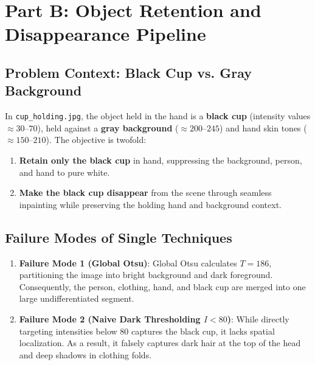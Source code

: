 \documentclass[12pt]{article}
\begin{document}
\section{Part B: Object Retention and Disappearance Pipeline}

\subsection{Problem Context: Black Cup vs. Gray Background}
In \texttt{cup\_holding.jpg}, the object held in the hand is a \textbf{black cup} (intensity values $\approx 30\text{--}70$), held against a \textbf{gray background} ($\approx 200\text{--}245$) and hand skin tones ($\approx 150\text{--}210$).
The objective is twofold:
\begin{enumerate}
    \item \textbf{Retain only the black cup} in hand, suppressing the background, person, and hand to pure white.
    \item \textbf{Make the black cup disappear} from the scene through seamless inpainting while preserving the holding hand and background context.
\end{enumerate}

\subsection{Failure Modes of Single Techniques}
\begin{enumerate}
    \item \textbf{Failure Mode 1 (Global Otsu)}: Global Otsu calculates $T=186$, partitioning the image into bright background and dark foreground. Consequently, the person, clothing, hand, and black cup are merged into one large undifferentiated segment.
    \item \textbf{Failure Mode 2 (Naive Dark Thresholding $I < 80$)}: While directly targeting intensities below $80$ captures the black cup, it lacks spatial localization. As a result, it falsely captures dark hair at the top of the head and deep shadows in clothing folds.
\end{enumerate}
\end{document}
